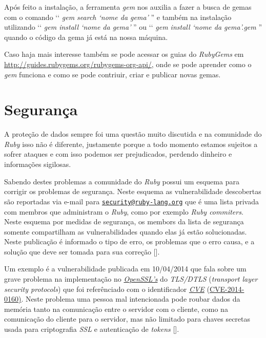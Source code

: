 Após feito a instalação, a ferramenta \emph{gem} nos auxilia a fazer a busca de gemas com o comando 
‘‘ \emph{gem search ‘nome da gema' }'' e também na instalação utilizando ‘‘ \emph{gem install ‘nome 
da gema' }'' ou ‘‘ \emph{gem install ‘nome da gema'.gem }'' quando o código da gema já está na nossa máquina.

Caso haja mais interesse também se pode acessar os guias do \emph{RubyGems} em 
\url{http://guides.rubygems.org/rubygems-org-api/}, onde se pode aprender como o \emph{gem} funciona e como
se pode contriuir, criar e publicar novas gemas. 

\section{Segurança}
\label{segurança_ruby}

A proteção de dados sempre foi uma questão muito discutida e na comunidade do \emph{Ruby} isso não é 
diferente, justamente porque a todo momento estamos sujeitos a sofrer ataques e com isso podemos ser 
prejudicados, perdendo dinheiro e informações sigilosas.

Sabendo destes problemas a comunidade do \emph{Ruby} possui um esquema para corrigir os problemas de 
segurança. Neste esquema as vulnerabilidade descobertas são reportadas via e-mail para
\href{mailto:security@ruby-lang.org}{\nolinkurl{security@ruby-lang.org}} que é uma lista privada com 
membros que administram o \emph{Ruby}, como por exemplo \emph{Ruby commiters}. Neste esquema por medidas 
de segurança, os membors da lista de segurança somente compartilham as vulnerabilidades quando elas já 
estão solucionadas. Neste publicação é informado o tipo de erro, os problemas que o erro causa, e a 
solução que deve ser tomada para 
sua correção [].

Um exemplo é a vulnerabilidade publicada em 10/04/2014 que fala sobre um grave problema na 
implementação no \emph{\href{https://www.openssl.org}{OpenSSL’s}} do \emph{TLS/DTLS} (\emph{transport 
layer security protocols}) que foi referênciado com o identificador \emph{\href{https://cve.mitre.org/}{CVE}} 
(\href{https://web.nvd.nist.gov/view/vuln/detail?vulnId=CVE-2014-0160}{CVE-2014-0160)}. Neste problema 
uma pessoa mal intencionada pode roubar dados da memória tanto na comunicação entre o servidor com o cliente,
como na comunicação do cliente para o servidor, mas não limitado para chaves secretas usada para criptografia
\emph{SSL} e autenticação de \emph{tokens} [].

